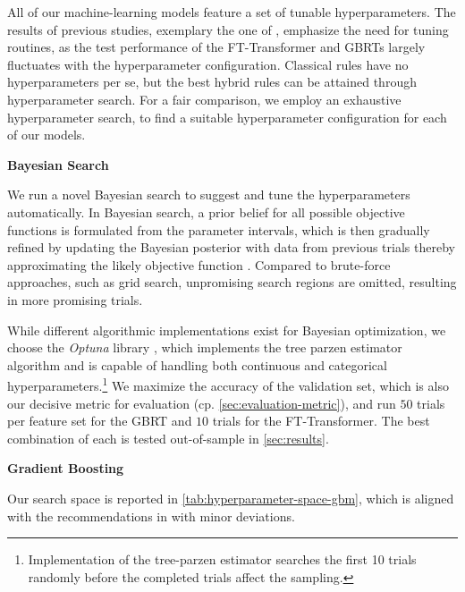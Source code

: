 All of our machine-learning models feature a set of tunable hyperparameters. The results of previous studies, exemplary the one of \textcite[\checkmark][5]{grinsztajnWhyTreebasedModels2022}, emphasize the need for tuning routines, as the test performance of the FT-Transformer and \glspl{GBRT} largely fluctuates with the hyperparameter configuration. Classical rules have no hyperparameters per se, but the best hybrid rules can be attained through hyperparameter search.
For a fair comparison, we employ an exhaustive hyperparameter search, to find a suitable hyperparameter configuration for each of our models.

\textbf{Bayesian Search}

We run a novel Bayesian search to suggest and tune the hyperparameters automatically. In Bayesian search, a prior belief for all possible objective functions is formulated from the parameter intervals, which is then gradually refined by updating the Bayesian posterior with data from previous trials thereby approximating the likely objective function \autocite[\checkmark][149]{shahriariTakingHumanOut2016}. Compared to brute-force approaches, such as grid search, unpromising search regions are omitted, resulting in more promising trials.

While different algorithmic implementations exist for Bayesian optimization, we choose the \emph{Optuna} library \autocite[\checkmark][2623--2631]{akibaOptunaNextgenerationHyperparameter2019}, which implements the tree parzen estimator algorithm and is capable of handling both continuous and categorical hyperparameters.\footnote{Implementation of the tree-parzen estimator searches the first 10 trials randomly before the completed trials affect the sampling.} We maximize the accuracy of the validation set, which is also our decisive metric for evaluation (cp. \cref{sec:evaluation-metric}), and run $\num{50}$ trials per feature set for the \gls{GBRT} and $\num{10}$ trials for the FT-Transformer. The best combination of each is tested out-of-sample in \cref{sec:results}.

\textbf{Gradient Boosting}

Our search space is reported in \cref{tab:hyperparameter-space-gbm}, which is aligned with the recommendations in \textcite[][6659]{prokhorenkovaCatBoostUnbiasedBoosting2018} with minor deviations.

